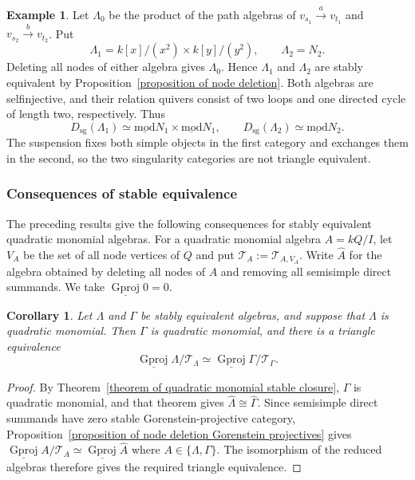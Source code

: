 \documentclass[11pt]{article}
\newcommand{\smod}{\operatorname{\underline{mod}}}
\providecommand{\varLambda}{\Lambda}
\providecommand{\varGamma}{\Gamma}
\newtheorem{corollary}[theorem]{Corollary}
\theoremstyle{definition}
\newtheorem{example}[theorem]{Example}
\begin{document}
			\begin{example}\label{example of node gluing different periods}
				Let $\varLambda_0$ be the product of the path algebras of $v_{s_1}\xrightarrow{a}v_{t_1}$ and $v_{s_2}\xrightarrow{b}v_{t_2}$. Put
				\[
					\varLambda_1=k[x]/(x^2)\times k[y]/(y^2),
					\qquad
					\varLambda_2=N_2.
				\]
				Deleting all nodes of either algebra gives $\varLambda_0$. Hence $\varLambda_1$ and $\varLambda_2$ are stably equivalent by Proposition~\ref{proposition of node deletion}. Both algebras are selfinjective, and their relation quivers consist of two loops and one directed cycle of length two, respectively. Thus
				\[
					D_{\mathrm{sg}}(\varLambda_1)
					\simeq\smod N_1\times\smod N_1,
					\qquad
					D_{\mathrm{sg}}(\varLambda_2)
					\simeq\smod N_2.
				\]
				The suspension fixes both simple objects in the first category
				and exchanges them in the second, so the two singularity categories
				are not triangle equivalent.
			\end{example}


		\subsubsection{Consequences of stable equivalence}


			The preceding results give the following consequences for stably equivalent quadratic monomial algebras. For a quadratic monomial algebra $A=kQ/I$, let $V_A$ be the set of all node vertices of $Q$ and put $\mathcal T_A:=\mathcal T_{A,V_A}$. Write $\widehat A$ for the algebra obtained by deleting all nodes of $A$ and removing all semisimple direct summands. We take $\underline{\operatorname{Gproj}}0=0$.

			\begin{corollary}
				\label{corollary of stable Gorenstein quotient invariant}
				Let $\varLambda$ and $\varGamma$ be stably equivalent algebras, and suppose that $\varLambda$ is quadratic monomial. Then $\varGamma$ is quadratic monomial, and there is a triangle equivalence
				\[
					\underline{\operatorname{Gproj}}\varLambda/\mathcal T_{\varLambda}
					\simeq
					\underline{\operatorname{Gproj}}\varGamma/\mathcal T_{\varGamma}.
				\]
			\end{corollary}

			\begin{proof}
				By Theorem~\ref{theorem of quadratic monomial stable closure}, $\varGamma$ is quadratic monomial, and that theorem gives $\widehat{\varLambda}\cong\widehat{\varGamma}$.
				Since semisimple direct summands have zero stable Gorenstein-projective category, Proposition~\ref{proposition of node deletion Gorenstein projectives} gives
				$\underline{\operatorname{Gproj}}A/\mathcal T_A\simeq\underline{\operatorname{Gproj}}\widehat A$ where $A\in\{\varLambda,\varGamma\}$. The isomorphism of the reduced algebras therefore gives the required triangle equivalence.
			\end{proof}
\end{document}
